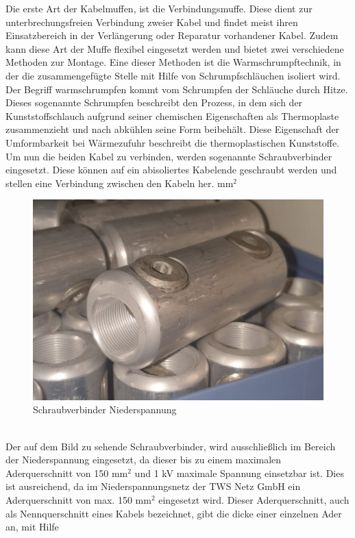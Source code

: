 Die erste Art der Kabelmuffen, ist die Verbindungsmuffe. Diese dient zur unterbrechungsfreien Verbindung zweier Kabel und findet meist ihren Einsatzbereich 
in der Verlängerung oder Reparatur vorhandener Kabel. Zudem kann diese Art der Muffe flexibel eingesetzt werden und bietet zwei verschiedene Methoden zur 
Montage. Eine dieser Methoden ist die Warmschrumpftechnik, in der die zusammengefügte Stelle mit Hilfe von Schrumpfschläuchen isoliert wird. Der Begriff 
warmschrumpfen kommt vom Schrumpfen der Schläuche durch Hitze. Dieses sogenannte Schrumpfen beschreibt den Prozess, in dem sich der Kunststoffschlauch 
aufgrund seiner chemischen Eigenschaften als Thermoplaste zusammenzieht und nach abkühlen seine Form beibehält. Diese Eigenschaft der Umformbarkeit bei 
Wärmezufuhr beschreibt die thermoplastischen Kunststoffe. Um nun die beiden Kabel zu verbinden, werden sogenannte Schraubverbinder eingesetzt. Diese können 
auf ein abisoliertes Kabelende geschraubt werden und stellen eine Verbindung zwischen den Kabeln her. $\text{mm}^2$
\begin{figure}[hbt]
\centering
\includegraphics[width=0.98\linewidth]{images/Schraubverbinder}
\caption[Schraubverbinder]{Schraubverbinder Niederspannung}
\label{fig:Schraubverbinder}
\end{figure}
\\
Der auf dem Bild zu sehende Schraubverbinder, wird ausschließlich im Bereich der Niederspannung eingesetzt, da dieser bis zu einem maximalen Aderquerschnitt 
von 150 $\text{mm}^2$ und 1 kV maximale Spannung einsetzbar ist. Dies ist ausreichend, da im Niederspannungsnetz der TWS Netz GmbH ein Aderquerschnitt von 
max. 150 $\text{mm}^2$ eingesetzt wird. Dieser Aderquerschnitt, auch als Nennquerschnitt eines Kabels bezeichnet, gibt die dicke einer einzelnen Ader an, mit Hilfe 

